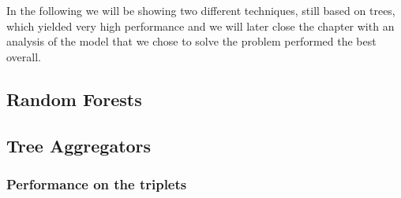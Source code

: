 In the following we will be showing two different techniques, still based on trees, which yielded
very high performance and we will later close the chapter with an analysis of the model that we
chose to solve the problem performed the best overall.

\subsection{Random Forests}

\subsection{Tree Aggregators}

\subsubsection{Performance on the triplets}
